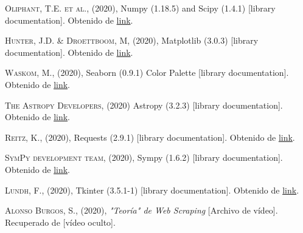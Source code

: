 \documentclass[11pt]{book}
\begin{document}
\begin{thebibliography}{99}

 \textsc{Oliphant, T.E. et al.}, (2020), Numpy (1.18.5) and Scipy (1.4.1) [library documentation]. Obtenido de \href{https://docs.scipy.org/doc/}{link}.

 \textsc{Hunter, J.D. \& Droettboom, M}, (2020), Matplotlib (3.0.3) [library documentation]. Obtenido de \href{https://matplotlib.org/3.0.3/index.html}{link}.

 \textsc{Waskom, M.}, (2020), Seaborn (0.9.1) Color Palette [library documentation]. Obtenido de \href{https://seaborn.pydata.org/tutorial/color_palettes.html}{link}.

 \textsc{The Astropy Developers}, (2020) Astropy (3.2.3) [library documentation]. Obtenido de \href{https://docs.astropy.org/en/stable/index.html}{link}.

 \textsc{Reitz, K.}, (2020), Requests (2.9.1) [library documentation]. Obtenido de \href{https://requests.readthedocs.io/_/downloads/es/es/latest/pdf/}{link}.

 \textsc{SymPy development team}, (2020), Sympy (1.6.2) [library documentation]. Obtenido de \href{https://docs.sympy.org/latest/index.html}{link}.

 \textsc{Lundh, F.}, (2020), Tkinter (3.5.1-1) [library documentation]. Obtenido de \href{https://docs.python.org/3/library/tk.html}{link}.

 \textsc{Alonso Burgos, S.}, (2020), \textit{"Teoría" de Web Scraping} [Archivo de vídeo]. Recuperado de [vídeo oculto].

\end{thebibliography}
\end{document}
